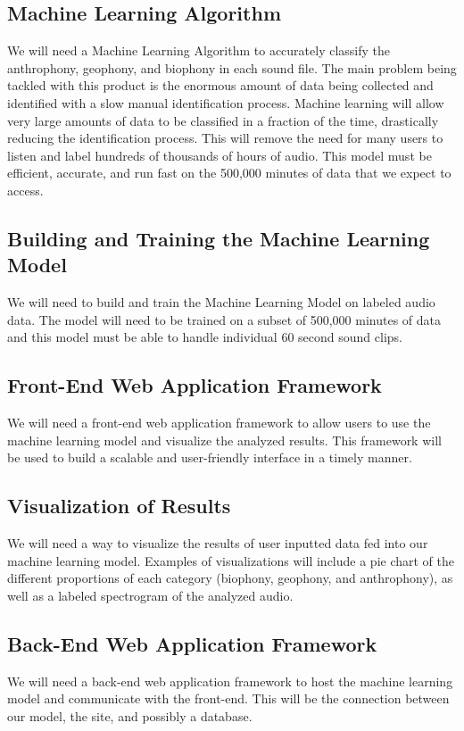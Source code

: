 \documentclass[12pt,journal,compsoc]{IEEEtran}
\newenvironment{subs}
  {\adjustwidth{1em}{0pt}}
  {\endadjustwidth}
\begin{document}
\begin{subs}
\subsection{Machine Learning Algorithm}
We will need a Machine Learning Algorithm to accurately classify the anthrophony, geophony, and biophony in each sound file. The main problem being tackled with this product is the enormous amount of data being collected and identified with a slow manual identification process. Machine learning will allow very large amounts of data to be classified in a fraction of the time, drastically reducing the identification process. This will remove the need for many users to listen and label hundreds of thousands of hours of audio. This model must be efficient, accurate, and run fast on the 500,000 minutes of data that we expect to access.

\subsection{Building and Training the Machine Learning Model}
We will need to build and train the Machine Learning Model on labeled audio data. The model will need to be trained on a subset of 500,000 minutes of data and this model must be able to handle individual 60 second sound clips. 

\subsection{Front-End Web Application Framework}
We will need a front-end web application framework to allow users to use the machine learning model and visualize the analyzed results. This framework will be used to build a scalable and user-friendly interface in a timely manner.

\subsection{Visualization of Results}
We will need a way to visualize the results of user inputted data fed into our machine learning model. Examples of visualizations will include a pie chart of the different proportions of each category (biophony, geophony, and anthrophony), as well as a labeled spectrogram of the analyzed audio. 

\subsection{Back-End Web Application Framework}
We will need a back-end web application framework to host the machine learning model and communicate with the front-end. This will be the connection between our model, the site, and possibly a database.


\end{subs}
\end{document}
